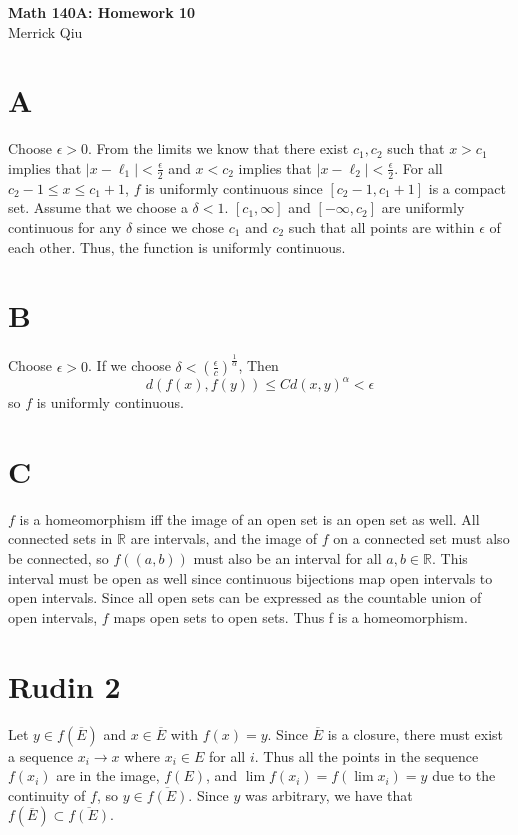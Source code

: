 \documentclass{article}
\begin{document}
\begin{center}
	\huge{\bf Math 140A: Homework 10} \\
	Merrick Qiu
\end{center}

\section*{A}
Choose $\epsilon > 0$. From the limits we know that there exist
$c_1, c_2$ such that $x > c_1$ implies that $|x-\ell_1| < \frac{\epsilon}{2}$
and $x < c_2$ implies that $|x-\ell_2| < \frac{\epsilon}{2}$.
For all $c_2-1 \leq x \leq c_1+1$, $f$ is uniformly continuous since 
$[c_2-1, c_1+1]$ is a compact set. Assume that we choose a $\delta < 1$.
$[c_1, \infty]$ and $[-\infty, c_2]$
are uniformly continuous for any $\delta$ since we chose $c_1$ and $c_2$
such that all points are within $\epsilon$ of each other.
Thus, the function is uniformly continuous.
\newpage 

\section*{B}
Choose $\epsilon > 0$.
If we choose $\delta < \left(\frac{\epsilon}{c}\right)^{\frac{1}{\alpha}}$,
Then 
\[
	d(f(x), f(y)) \leq Cd(x,y)^{\alpha} < \epsilon
\]
so $f$ is uniformly continuous.

\newpage 

\section*{C}
$f$ is a homeomorphism iff the image of an open set is an open set as well.
All connected sets in $\mathbb{R}$ are intervals, and the image of $f$ 
on a connected set must also be connected, so $f((a,b))$ must also be an interval for all $a,b \in \mathbb{R}$. 
This interval must be open as well since 
continuous bijections map open intervals to open intervals.
Since all open sets can be expressed as the countable union of open intervals,
$f$ maps open sets to open sets.
Thus f is a homeomorphism.
\newpage 

\section*{Rudin 2}
Let $y \in f(\overline{E})$ and 
$x \in \overline{E}$ with $f(x) = y$.
Since $\overline{E}$ is a closure,
there must exist a sequence $x_i \to x$
where $x_i \in E$ for all $i$.
Thus all the points in the sequence $f(x_i)$ are in 
the image, $f(E)$, and $\lim f(x_i) = f(\lim x_i) = y$ due to the continuity of $f$,
so $y \in \overline{f(E)}$.
Since $y$ was arbitrary, we have that 
$f(\overline{E}) \subset \overline{f(E)}$. \\
\end{document}
